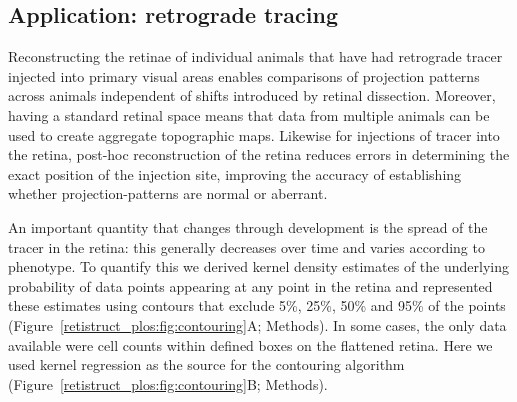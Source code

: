 \documentclass[10pt]{article}
\begin{document}

\subsection*{Application: retrograde tracing}

Reconstructing the retinae of individual animals that have had
retrograde tracer injected into primary visual areas enables
comparisons of projection patterns across animals independent of
shifts introduced by retinal dissection. Moreover, having a standard
retinal space means that data from multiple animals can be used to
create aggregate topographic maps. Likewise for injections of tracer
into the retina, post-hoc reconstruction of the retina reduces errors
in determining the exact position of the injection site, improving the
accuracy of establishing whether projection-patterns are normal or
aberrant.

An important quantity that changes through development is the spread
of the tracer in the retina: this generally decreases over time and
varies according to phenotype. To quantify this we derived kernel
density estimates of the underlying probability of data points
appearing at any point in the retina and represented these estimates
using contours that exclude 5\%, 25\%, 50\% and 95\% of the points
(Figure~\ref{retistruct_plos:fig:contouring}A; Methods). In some
cases, the only data available were cell counts within defined boxes
on the flattened retina. Here we used kernel regression as the source
for the contouring algorithm
(Figure~\ref{retistruct_plos:fig:contouring}B; Methods).



\end{document}
